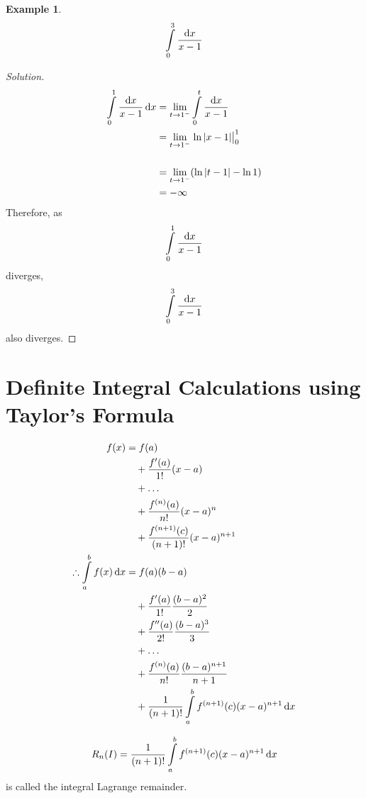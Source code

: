 \documentclass[fleqn, a4paper, 12pt]{article}
\theoremstyle{definition}
\newtheorem{example}{Example}
\theoremstyle{theorem}
\theoremstyle{remark}
\newenvironment{solution}
{\begin{proof}[Solution]\let\qed\relax}
	{\end{proof}}
\begin{document}
\begin{example}
	\begin{equation*}
		\int\limits_{0}^{3} \dfrac{\dif x}{x - 1}
	\end{equation*}
\end{example}

\begin{solution}
	\begin{align*}
		\int\limits_{0}^{1} \dfrac{\dif x}{x - 1} \dif x &= \lim\limits_{t \to 1^-} \int\limits_{0}^{t} \dfrac{\dif x}{x - 1}\\
		&= \lim\limits_{t \to 1^-} \left. \ln |x - 1| \right\rvert_{0}^{1}\\\\
		&= \lim\limits_{t \to 1^-} (\ln |t - 1| - \ln 1)\\
		&= -\infty
	\end{align*}
	Therefore, as \[\int\limits_{0}^{1} \dfrac{\dif x}{x - 1}\] diverges, \[\int\limits_{0}^{3} \dfrac{\dif x}{x - 1}\] also diverges.
\end{solution}

\section{Definite Integral Calculations using Taylor's Formula}

\begin{align*}
	f(x) &= f(a)\\
	&\quad + \dfrac{f'(a)}{1!} (x - a)\\
	&\quad + \dots\\
	&\quad + \dfrac{f^{(n)}(a)}{n!} (x - a)^n\\
	&\quad + \dfrac{f^{(n + 1)}(c)}{(n + 1)!} (x - a)^{n + 1}\\
	\therefore \int\limits_{a}^{b} f(x) \dif x &= f(a) (b - a)\\
	&\quad + \dfrac{f'(a)}{1!} \dfrac{(b - a)^2}{2}\\
	&\quad + \dfrac{f''(a)}{2!} \dfrac{(b - a)^3}{3}\\
	&\quad + \dots\\
	&\quad + \dfrac{f^{(n)}(a)}{n!} \dfrac{(b - a)^{n + 1}}{n + 1}\\
	&\quad + \dfrac{1}{(n + 1)!} \int\limits_{a}^{b} f^{(n + 1)}(c) (x - a)^{n + 1} \dif x
\end{align*}

\begin{equation*}
	R_n (I) = \dfrac{1}{(n + 1)!} \int\limits_{a}^{b} f^{(n + 1)}(c) (x - a)^{n + 1} \dif x
\end{equation*}
is called the integral Lagrange remainder.
\end{document}
